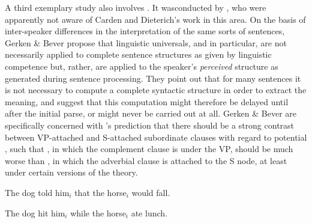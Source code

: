 A third exemplary study also involves . It was\linebreak conducted by \citet{GerkenEtAl1986}, who were apparently not aware of Carden
and Dieterich's work in this area. On the basis of inter-speaker differences in the interpretation of the same sorts of sentences, Gerken \& Bever propose that linguistic universals, and  in particular, are not necessarily applied to complete sentence structures as given by linguistic competence but, rather, are applied to the speaker's \textit{perceived} structure as generated during sentence processing. They point out that for many sentences it is not necessary to compute a complete syntactic structure in order to extract the meaning, and suggest that this computation might therefore be delayed until after the initial parse, or might never be carried out at all. Gerken \& Bever are specifically concerned with 's prediction that there should be a strong contrast between VP-attached and S-attached subordinate clauses with regard to potential , such that , in which the complement clause is under the VP, should be much worse than , in which the adverbial clause is attached to the S node, at least under certain versions of the theory.


\ea\label{ex:1:4}
The dog told him$_i$ that the horse$_i$ would fall.
\z


\ea\label{ex:1:5}
The dog hit him$_i$ while the horse$_i$ ate lunch.
\z

